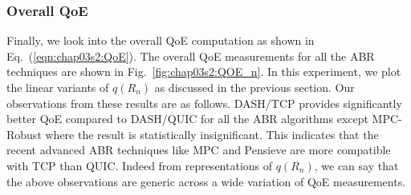 \subsubsection{Overall QoE}
Finally, we look into the overall QoE computation as shown in Eq.~(\ref{eqn:chap03s2:QoE}). The overall QoE measurements for  all the ABR techniques are shown in Fig.~\ref{fig:chap03s2:QOE_n}. In this experiment, we plot the linear variants of $q(R_n)$ as discussed in the previous section. Our observations from these results are as follows. DASH/TCP provides significantly better QoE compared to DASH/QUIC for all the ABR algorithms except MPC-Robust where the result is statistically insignificant. This indicates that the recent advanced ABR techniques like MPC and Pensieve are more compatible with TCP than QUIC. Indeed from representations of $q(R_n)$, we can say that the above observations are generic across a wide variation of QoE measurements. 


